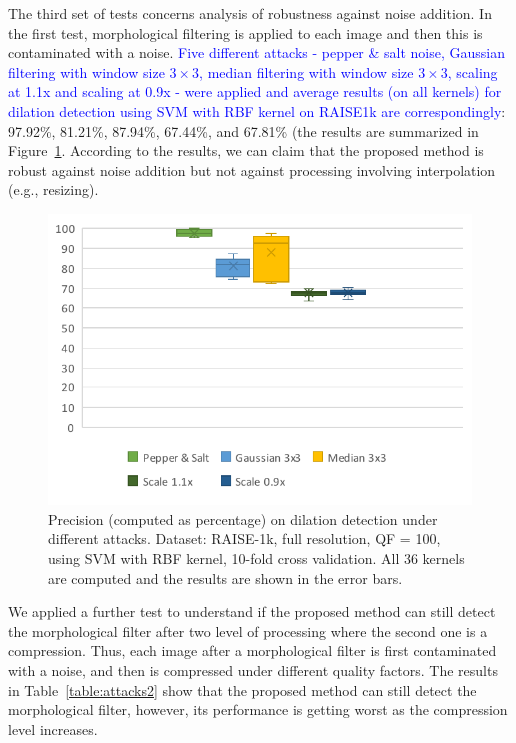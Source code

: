 \documentclass{ieeeaccess}
\newcommand{\revisedtext}[1]{\textcolor{blue}{#1}}
\begin{document}
The third set of tests concerns analysis of robustness against noise addition. In the first test, morphological filtering is applied to each image and then this is contaminated with a noise. \revisedtext{Five different attacks - pepper \& salt noise, Gaussian filtering with window size $3 \times 3$, median filtering with window size $3 \times 3$, scaling at 1.1x and scaling at 0.9x - were applied and average results (on all kernels) for dilation detection using SVM with RBF kernel on RAISE1k are correspondingly}: 97.92\%, 81.21\%, 87.94\%, 67.44\%, and 67.81\% (the results are summarized in Figure~\ref{fig:attacks_1}. According to the results, we can claim that the proposed method is robust against noise addition but not against processing involving interpolation (e.g., resizing). 

\begin{figure}[t!]
	\centering
	\includegraphics[width=\linewidth]{attacks_1.pdf}
	\caption{Precision (computed as percentage) on dilation detection under different attacks. Dataset: RAISE-1k, full resolution, QF = 100, using SVM with RBF kernel, 10-fold cross validation. All 36 kernels are computed and the results are shown in the error bars.}
	\label{fig:attacks_1}
\end{figure}

We applied a further test to understand if the proposed method can still detect the morphological filter after two level of processing where the second one is a compression. Thus, each image after a morphological filter is first contaminated with a noise, and then is compressed under different quality factors.  The results in Table~\ref{table:attacks2} show that the proposed method can still detect the morphological filter, however, its performance is getting worst as the compression level increases.  
\end{document}
